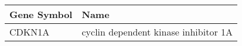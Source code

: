 \begin{tabular}{ll}
\toprule
Gene Symbol &                                 Name \\
\midrule
     CDKN1A & cyclin dependent kinase inhibitor 1A \\
\bottomrule
\end{tabular}
